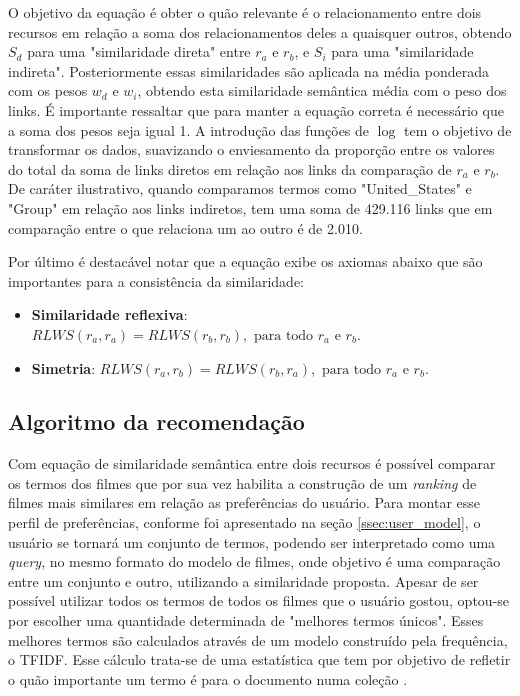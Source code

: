 O objetivo da equação é obter o quão relevante é o relacionamento entre dois recursos em relação a soma dos relacionamentos deles a quaisquer outros, obtendo $S_d$ para uma "similaridade direta" entre $r_a$ e $r_b$, e $S_i$ para uma "similaridade indireta". Posteriormente essas similaridades são aplicada na média ponderada com os pesos $w_d$ e $w_i$, obtendo esta similaridade semântica média com o peso dos links. É importante ressaltar que para manter a equação correta é necessário que a soma dos pesos seja igual 1. A introdução das funções de $\log$ tem o objetivo de transformar os dados, suavizando o enviesamento da proporção entre os valores do total da soma de links diretos em relação aos links da comparação de $r_a$ e $r_b$. De caráter ilustrativo, quando comparamos termos como "United\_States" e "Group" em relação aos links indiretos, tem uma soma de 429.116 links que em comparação entre o que relaciona um ao outro é de 2.010.

Por último é destacável notar que a equação exibe os axiomas abaixo que são importantes para a consistência da similaridade:

\begin{itemize}
	\item{\textbf{Similaridade reflexiva}: $RLWS(r_a, r_a) = RLWS(r_b, r_b), \text{ para todo } r_a \text{ e } r_b$.}
	\item{\textbf{Simetria}: $RLWS(r_a, r_b) = RLWS(r_b, r_a), \text{ para todo } r_a \text{ e } r_b$.}
\end{itemize}

\subsection{Algoritmo da recomendação}
\label{ssec:rec_alg}

Com equação de similaridade semântica entre dois recursos é possível comparar os termos dos filmes que por sua vez habilita a construção de um \textit{ranking} de filmes mais similares em relação as preferências do usuário. Para montar esse perfil de preferências, conforme foi apresentado na seção \ref{ssec:user_model}, o usuário se tornará um conjunto de termos, podendo ser interpretado como uma \textit{query}, no mesmo formato do modelo de filmes, onde objetivo é uma comparação entre um conjunto e outro, utilizando a similaridade proposta. Apesar de ser possível utilizar todos os termos de todos os filmes que o usuário gostou, optou-se por escolher uma quantidade determinada de "melhores termos únicos". Esses melhores termos são calculados através de um modelo construído pela frequência, o \ac{TFIDF}. Esse cálculo trata-se de uma estatística que tem por objetivo de refletir o quão importante um termo é para o documento numa coleção \citep{rajaraman_ullman_2011}.

